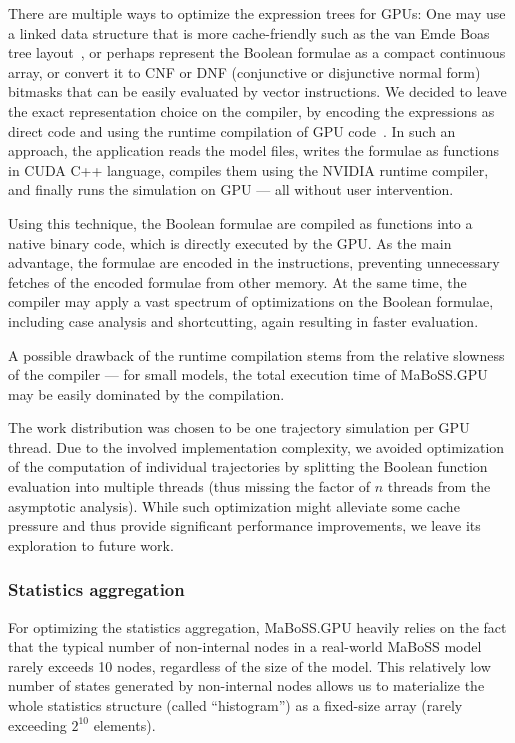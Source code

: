 \documentclass[sn-mathphys-num]{sn-jnl}%
\begin{document}
There are multiple ways to optimize the expression trees for GPUs: One may use a linked data structure that is more cache-friendly such as the van Emde Boas tree layout~\cite{van1975preserving}, or perhaps represent the Boolean formulae as a compact continuous array, or convert it to CNF or DNF (conjunctive or disjunctive normal form) bitmasks that can be easily evaluated by vector instructions. We decided to leave the exact representation choice on the compiler, by encoding the expressions as direct code and using the runtime compilation of GPU code~\cite{nvrtc}. In such an approach, the application reads the model files, writes the formulae as functions in CUDA C++ language, compiles them using the NVIDIA runtime compiler, and finally runs the simulation on GPU --- all without user intervention.

Using this technique, the Boolean formulae are compiled as functions into a native binary code, which is directly executed by the GPU. As the main advantage, the formulae are encoded in the instructions, preventing unnecessary fetches of the encoded formulae from other memory. At the same time, the compiler may apply a vast spectrum of optimizations on the Boolean formulae, including case analysis and shortcutting, again resulting in faster evaluation.

A possible drawback of the runtime compilation stems from the relative slowness of the compiler --- for small models, the total execution time of MaBoSS.GPU may be easily dominated by the compilation.

The work distribution was chosen to be one trajectory simulation per GPU thread. Due to the involved implementation complexity, we avoided optimization of the computation of individual trajectories by splitting the Boolean function evaluation into multiple threads (thus missing the factor of $n$ threads from the asymptotic analysis). While such optimization might alleviate some cache pressure and thus provide significant performance improvements, we leave its exploration to future work.

\subsubsection*{Statistics aggregation}

For optimizing the statistics aggregation, MaBoSS.GPU heavily relies on the fact that the typical number of non-internal nodes in a real-world MaBoSS model rarely exceeds 10 nodes, regardless of the size of the model. This relatively low number of states generated by non-internal nodes allows us to materialize the whole statistics structure (called ``histogram'') as a fixed-size array (rarely exceeding $2^{10}$ elements).
\end{document}
